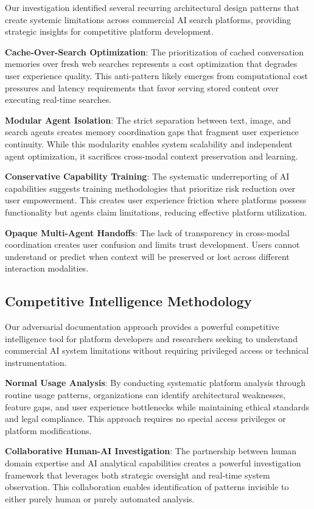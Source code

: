 \documentclass[12pt]{article}
\begin{document}
Our investigation identified several recurring architectural design patterns that create systemic limitations across commercial AI search platforms, providing strategic insights for competitive platform development.

\textbf{Cache-Over-Search Optimization}: The prioritization of cached conversation memories over fresh web searches represents a cost optimization that degrades user experience quality. This anti-pattern likely emerges from computational cost pressures and latency requirements that favor serving stored content over executing real-time searches.

\textbf{Modular Agent Isolation}: The strict separation between text, image, and search agents creates memory coordination gaps that fragment user experience continuity. While this modularity enables system scalability and independent agent optimization, it sacrifices cross-modal context preservation and learning.

\textbf{Conservative Capability Training}: The systematic underreporting of AI capabilities suggests training methodologies that prioritize risk reduction over user empowerment. This creates user experience friction where platforms possess functionality but agents claim limitations, reducing effective platform utilization.

\textbf{Opaque Multi-Agent Handoffs}: The lack of transparency in cross-modal coordination creates user confusion and limits trust development. Users cannot understand or predict when context will be preserved or lost across different interaction modalities.

\subsection{Competitive Intelligence Methodology}

Our adversarial documentation approach provides a powerful competitive intelligence tool for platform developers and researchers seeking to understand commercial AI system limitations without requiring privileged access or technical instrumentation.

\textbf{Normal Usage Analysis}: By conducting systematic platform analysis through routine usage patterns, organizations can identify architectural weaknesses, feature gaps, and user experience bottlenecks while maintaining ethical standards and legal compliance. This approach requires no special access privileges or platform modifications.

\textbf{Collaborative Human-AI Investigation}: The partnership between human domain expertise and AI analytical capabilities creates a powerful investigation framework that leverages both strategic oversight and real-time system observation. This collaboration enables identification of patterns invisible to either purely human or purely automated analysis.
\end{document}
